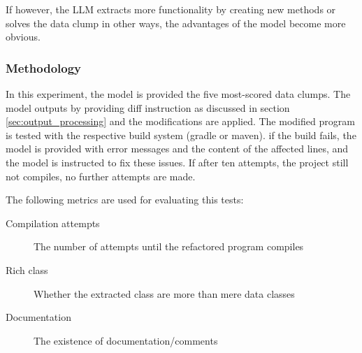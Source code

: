 If however, the \ac{LLM} extracts more functionality by creating new methods or solves the data clump in other ways, the advantages of the model become more obvious.


\subsubsection{Methodology}

In this experiment, the model is provided the five most-scored data clumps. The model outputs by providing diff instruction as discussed in section \ref{sec:output_processing} and the modifications are applied.  The modified program is tested with the respective build system (gradle or maven). if the build fails, the model is provided with error messages and the content of the affected lines, and the model is instructed to fix these issues. If after ten attempts, the project still not compiles, no further attempts are made. 

The following metrics are used for evaluating this tests:

\begin{description}
    \item [Compilation attempts] The number of attempts until the refactored program compiles
    \item [Rich class] Whether the extracted class are more than mere data classes
    \item [Documentation] The existence of documentation/comments
\end{description}

